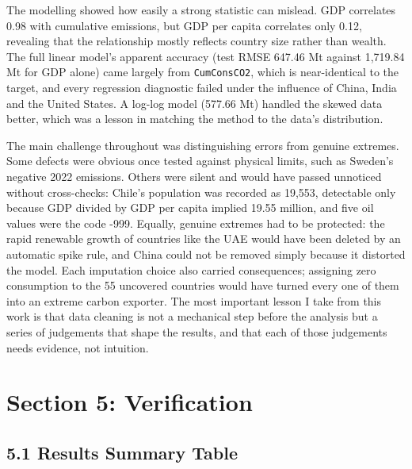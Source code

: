 \documentclass[
]{article}
\begin{document}
The modelling showed how easily a strong statistic can mislead. GDP
correlates 0.98 with cumulative emissions, but GDP per capita correlates
only 0.12, revealing that the relationship mostly reflects country size
rather than wealth. The full linear model's apparent accuracy (test RMSE
647.46 Mt against 1,719.84 Mt for GDP alone) came largely from
\texttt{CumConsCO2}, which is near-identical to the target, and every
regression diagnostic failed under the influence of China, India and the
United States. A log-log model (577.66 Mt) handled the skewed data
better, which was a lesson in matching the method to the data's
distribution.

The main challenge throughout was distinguishing errors from genuine
extremes. Some defects were obvious once tested against physical limits,
such as Sweden's negative 2022 emissions. Others were silent and would
have passed unnoticed without cross-checks: Chile's population was
recorded as 19,553, detectable only because GDP divided by GDP per
capita implied 19.55 million, and five oil values were the code -999.
Equally, genuine extremes had to be protected: the rapid renewable
growth of countries like the UAE would have been deleted by an automatic
spike rule, and China could not be removed simply because it distorted
the model. Each imputation choice also carried consequences; assigning
zero consumption to the 55 uncovered countries would have turned every
one of them into an extreme carbon exporter. The most important lesson I
take from this work is that data cleaning is not a mechanical step
before the analysis but a series of judgements that shape the results,
and that each of those judgements needs evidence, not intuition.

\newpage

\section{Section 5: Verification}\label{section-5-verification}

\subsection{5.1 Results Summary Table}\label{results-summary-table}
\end{document}
